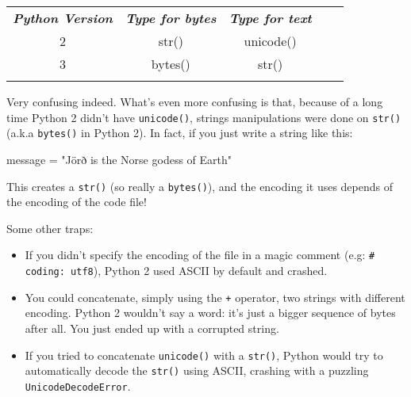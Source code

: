 \begin{table}[h]
\begin{tabular}{cccll}
\cline{1-3}
\multicolumn{1}{|c|}{\textit{\textbf{Python Version}}} & \multicolumn{1}{c|}{\textit{\textbf{Type for bytes}}} & \multicolumn{1}{c|}{\textit{\textbf{Type for text}}} &  &  \\ \cline{1-3}
\multicolumn{1}{|c|}{2}                                & \multicolumn{1}{c|}{str()}                            & \multicolumn{1}{c|}{unicode()}                       &  &  \\ \cline{1-3}
\multicolumn{1}{|c|}{3}                                & \multicolumn{1}{c|}{bytes()}                          & \multicolumn{1}{c|}{str()}                           &  &  \\ \cline{1-3}
\multicolumn{1}{l}{}                                   & \multicolumn{1}{l}{}                                  & \multicolumn{1}{l}{}                                 &  &
\end{tabular}
\end{table}

Very confusing indeed. What's even more confusing is that, because of a long time Python 2 didn't have \lstinline{unicode()}, strings manipulations were done on \lstinline{str()} (a.k.a \lstinline{bytes()} in Python 2). In fact, if you just write a string like this:

\begin{py2}
message = "Jörð is the Norse godess of Earth"
\end{py2}

This creates a \lstinline{str()} (so really a \lstinline{bytes()}), and the encoding it uses depends of the encoding of the code file!

Some other traps:

\begin{itemize}
    \item If you didn't specify the encoding of the file in a magic comment (e.g: \lstinline{# coding: utf8}), Python 2 used ASCII by default and crashed.
    \item You could concatenate, simply using the \lstinline{+} operator, two strings with different encoding. Python 2 wouldn't say a word: it's just a bigger sequence of bytes after all. You just ended up with a corrupted string.
    \item If you tried to concatenate \lstinline{unicode()} with a \lstinline{str()}, Python would try to automatically decode the \lstinline{str()} using ASCII, crashing with a puzzling \lstinline{UnicodeDecodeError}.
\end{itemize}

